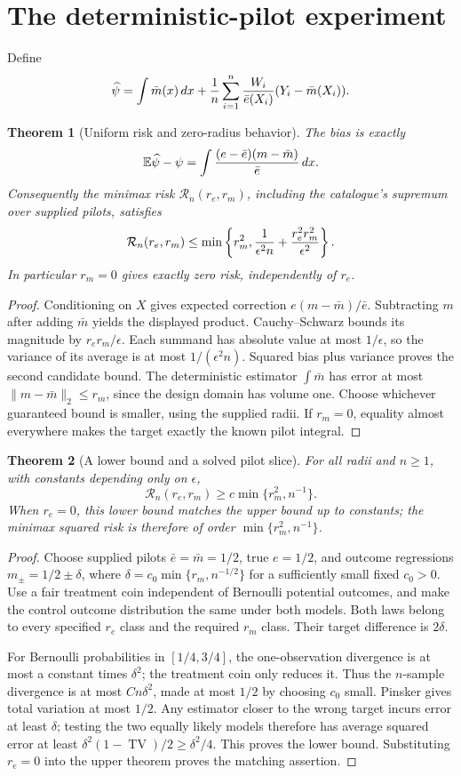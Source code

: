 \documentclass[11pt,a4paper]{article}
\newtheorem{theorem}{Theorem}[section]
\theoremstyle{definition}
\theoremstyle{remark}
\newcommand{\E}{\mathbb{E}}
\begin{document}
\section{The deterministic-pilot experiment}
Define
\[
 \widehat\psi=\int\bar m(x)\,dx+
 {1\over n}\sum_{i=1}^n {W_i\over\bar e(X_i)}(Y_i-\bar m(X_i)).
\]
\begin{theorem}[Uniform risk and zero-radius behavior]
The bias is exactly
\[
 \E\widehat\psi-\psi=
 \int{(e-\bar e)(m-\bar m)\over\bar e}\,dx.
\]
Consequently the minimax risk $\mathcal R_n(r_e,r_m)$, including the catalogue's supremum over supplied pilots, satisfies
\[
 \mathcal R_n(r_e,r_m)\le
 \min\left\{r_m^2,{1\over\epsilon^2 n}
                         +{r_e^2r_m^2\over\epsilon^2}\right\}.
\]
In particular $r_m=0$ gives exactly zero risk, independently of $r_e$.
\end{theorem}
\begin{proof}
Conditioning on $X$ gives expected correction $e(m-\bar m)/\bar e$. Subtracting $m$ after adding $\bar m$ yields the displayed product. Cauchy--Schwarz bounds its magnitude by $r_er_m/\epsilon$. Each summand has absolute value at most $1/\epsilon$, so the variance of its average is at most $1/(\epsilon^2n)$. Squared bias plus variance proves the second candidate bound. The deterministic estimator $\int\bar m$ has error at most $\|m-\bar m\|_2\le r_m$, since the design domain has volume one. Choose whichever guaranteed bound is smaller, using the supplied radii. If $r_m=0$, equality almost everywhere makes the target exactly the known pilot integral.
\end{proof}
\begin{theorem}[A lower bound and a solved pilot slice]
For all radii and $n\ge1$, with constants depending only on $\epsilon$,
\[
 \mathcal R_n(r_e,r_m)\ge c\min\{r_m^2,n^{-1}\}.
\]
When $r_e=0$, this lower bound matches the upper bound up to constants; the minimax squared risk is therefore of order $\min\{r_m^2,n^{-1}\}$.
\end{theorem}
\begin{proof}
Choose supplied pilots $\bar e=\bar m=1/2$, true $e=1/2$, and outcome regressions $m_\pm=1/2\pm\delta$, where
$\delta=c_0\min\{r_m,n^{-1/2}\}$ for a sufficiently small fixed $c_0>0$. Use a fair treatment coin independent of Bernoulli potential outcomes, and make the control outcome distribution the same under both models. Both laws belong to every specified $r_e$ class and the required $r_m$ class. Their target difference is $2\delta$.

For Bernoulli probabilities in $[1/4,3/4]$, the one-observation divergence is at most a constant times $\delta^2$; the treatment coin only reduces it. Thus the $n$-sample divergence is at most $C n\delta^2$, made at most $1/2$ by choosing $c_0$ small. Pinsker gives total variation at most $1/2$. Any estimator closer to the wrong target incurs error at least $\delta$; testing the two equally likely models therefore has average squared error at least $\delta^2(1-\operatorname{TV})/2\ge\delta^2/4$. This proves the lower bound. Substituting $r_e=0$ into the upper theorem proves the matching assertion.
\end{proof}
\end{document}
